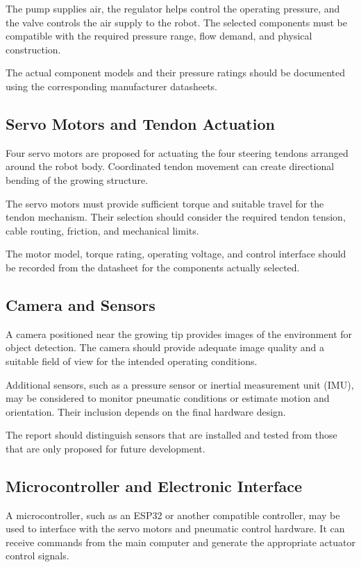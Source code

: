 The pump supplies air, the regulator helps control the operating pressure, and the valve controls the air supply to the robot. The selected components must be compatible with the required pressure range, flow demand, and physical construction.

The actual component models and their pressure ratings should be documented using the corresponding manufacturer datasheets.

\subsection{Servo Motors and Tendon Actuation}

Four servo motors are proposed for actuating the four steering tendons arranged around the robot body. Coordinated tendon movement can create directional bending of the growing structure.

The servo motors must provide sufficient torque and suitable travel for the tendon mechanism. Their selection should consider the required tendon tension, cable routing, friction, and mechanical limits.

The motor model, torque rating, operating voltage, and control interface should be recorded from the datasheet for the components actually selected.

\subsection{Camera and Sensors}

A camera positioned near the growing tip provides images of the environment for object detection. The camera should provide adequate image quality and a suitable field of view for the intended operating conditions.

Additional sensors, such as a pressure sensor or inertial measurement unit (IMU), may be considered to monitor pneumatic conditions or estimate motion and orientation. Their inclusion depends on the final hardware design.

The report should distinguish sensors that are installed and tested from those that are only proposed for future development.

\subsection{Microcontroller and Electronic Interface}

A microcontroller, such as an ESP32 or another compatible controller, may be used to interface with the servo motors and pneumatic control hardware. It can receive commands from the main computer and generate the appropriate actuator control signals.

